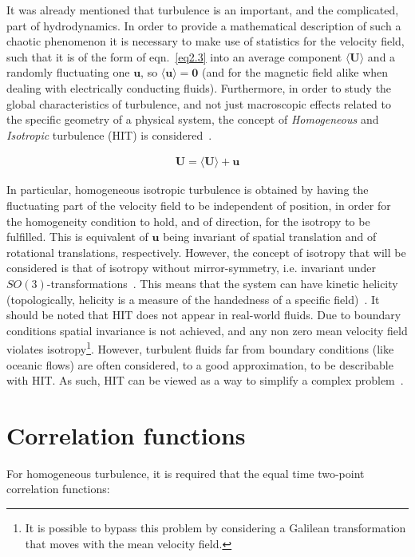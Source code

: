 \documentclass[12pt,a4paper]{report}
\begin{document}
It was already mentioned that turbulence is an important, and the complicated, part of hydrodynamics. In order to provide a mathematical description of such a chaotic phenomenon it is necessary to make use of statistics for the velocity field, such that it is of the form of eqn.~\ref{eq2.3} into an average component $\langle \bm U \rangle$ and a randomly fluctuating one $\bm u$, so $\langle \bm u \rangle = \bm 0$ (and for the magnetic field alike when dealing with electrically conducting fluids). Furthermore, in order to study the global characteristics of turbulence, and not just macroscopic effects related to the specific geometry of a physical system, the concept of \textit{Homogeneous} and \textit{Isotropic} turbulence (HIT) is considered~\cite{biskamp1997nonlinear}.

\begin{align}
 \bm U = \langle \bm U \rangle + \bm u
 \label{eq2.3}
\end{align}

In particular, homogeneous isotropic turbulence is obtained by having the fluctuating part of the velocity field to be independent of position, in order for the homogeneity condition to hold, and of direction, for the isotropy to be fulfilled. This is equivalent of $\bm u$ being invariant of spatial translation and of rotational translations, respectively. However, the concept of isotropy that will be considered is that of isotropy without mirror-symmetry, i.e. invariant under $SO(3)$-transformations~\cite{biskamp1997nonlinear}. This means that the system can have kinetic helicity (topologically, helicity is a measure of the handedness of a specific field)~\cite{brandenburg2005astrophysical, hughes1996kinetic}. It should be noted that HIT does not appear in real-world fluids. Due to boundary conditions spatial invariance is not achieved, and any non zero mean velocity field violates isotropy\footnote{It is possible to bypass this problem by considering a Galilean transformation that moves with the mean velocity field.}. However, turbulent fluids far from boundary conditions (like oceanic flows) are often considered, to a good approximation, to be describable with HIT. As such, HIT can be viewed as a way to simplify a complex problem~\cite{LinkmannMoritzFrederikLeon2016Spim}. 

\section{Correlation functions}

For homogeneous turbulence, it is required that the equal time two-point correlation functions:
\end{document}
